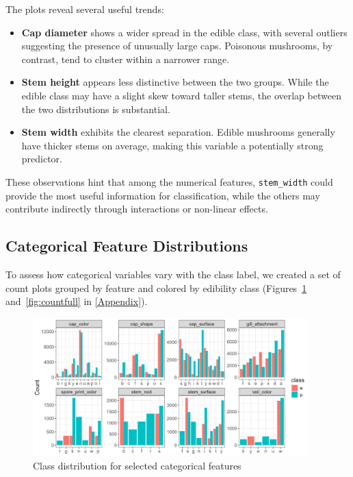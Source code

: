 \documentclass[a4paper,11pt]{article}
\begin{document}
The plots reveal several useful trends:
\begin{itemize}
  \item \textbf{Cap diameter} shows a wider spread in the edible class, with several outliers suggesting the presence of unusually large caps. Poisonous mushrooms, by contrast, tend to cluster within a narrower range.
  \item \textbf{Stem height} appears less distinctive between the two groups. While the edible class may have a slight skew toward taller stems, the overlap between the two distributions is substantial.
  \item \textbf{Stem width} exhibits the clearest separation. Edible mushrooms generally have thicker stems on average, making this variable a potentially strong predictor.
\end{itemize}

These observations hint that among the numerical features, \texttt{stem\_width} could provide the most useful information for classification, while the others may contribute indirectly through interactions or non-linear effects.

\subsection{Categorical Feature Distributions}

To assess how categorical variables vary with the class label, we created a set of count plots grouped by feature and colored by edibility class (Figures~\ref{fig:count} and~\ref{fig:countfull} in \ref{Appendix}).

\begin{figure}[h]
\centering
\includegraphics[width=0.95\textwidth]{Figure2-count-plots.png}
\caption{Class distribution for selected categorical features}
\label{fig:count}
\end{figure}
\end{document}
